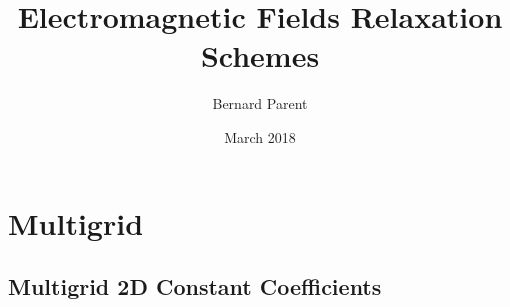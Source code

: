 \documentclass{warpdoc}
\author{
  Bernard Parent
}
\title{
  Electromagnetic Fields Relaxation Schemes
}
\date{
  March 2018
}
\begin{document}
  \pagestyle{headings}
  \setcounter{page}{1}
  \makewarpdoctitle
  \tableofcontents
\sloppy

\nocite{misc:1955:douglas}

\section{Multigrid}

\subsection{Multigrid 2D Constant Coefficients}
\end{document}
